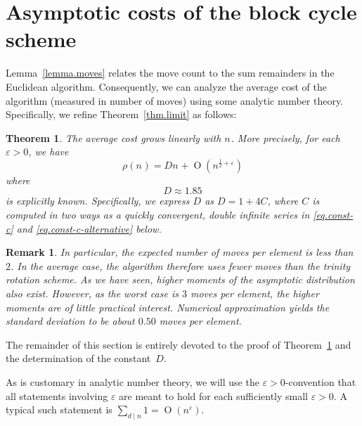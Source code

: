 \documentclass[12pt,a4paper]{article}
\newtheorem{thm}[lemma]{Theorem}
\newtheorem{rem}[lemma]{Remark}
\newcommand{\Size}[1][]{n_{#1}}
\newcommand{\AvgCostOf}[1]{\rho(#1)}
\newcommand{\TheCostConst}{D}
\newcommand{\TheZetaConst}{C}
\newcommand{\BigO}[1]{\operatorname{O}(#1)}
\newcommand{\TheEpsilon}{\varepsilon}
\begin{document}
  \section{Asymptotic costs of the block cycle scheme}\label{sec.restglied}
  Lemma~\ref{lemma.moves} relates the move count to the sum remainders
  in the Euclidean algorithm. Consequently, 
  we can analyze the average cost of the algorithm (measured in number
  of moves) using some analytic number theory. 
  Specifically, we refine Theorem~\ref{thm.limit} as follows:
  \begin{thm}\label{thm.main}
    The average cost grows linearly with $\Size$. More precisely,
    for each $\TheEpsilon>0$, we have
    \[
      \AvgCostOf{\Size}
      =
      \TheCostConst
      \Size
      +
      \BigO{\Size^{\frac12+\TheEpsilon}}
    \]
    where
    \[
      \TheCostConst
      \approx 1.85
    \]
    is explicitly known. Specifically, we express $\TheCostConst$ as
    $\TheCostConst=1+4 \TheZetaConst$, where $\TheZetaConst$ is computed in
    two ways as a quickly convergent, double infinite series in
    \eqref{eq.const-c} and \eqref{eq.const-c-alternative} below.
  \end{thm}
  
  \begin{rem}
    In particular, the expected number of moves per element is less
    than $2$. In the average case, the algorithm therefore uses fewer
    moves than the trinity rotation scheme. As we have seen, higher
    moments of the asymptotic distribution also exist. However, as the
    worst case is $3$ moves per element, the higher moments are of little
    practical interest. Numerical approximation yields the standard
    deviation to be about $0.50$ moves per element.
  \end{rem}
  
  The remainder of this section is entirely devoted to the proof of
  Theorem~\ref{thm.main} and the determination of the
  constant~$\TheCostConst$.
  
  As is customary in analytic number theory, we will use the
  $\TheEpsilon>0$-convention that all statements involving $\TheEpsilon$
  are meant to hold for each sufficiently small $\TheEpsilon>0$. A
  typical such statement is $\sum_{d \mid n} 1 = \BigO{n^\TheEpsilon}$.
\end{document}
